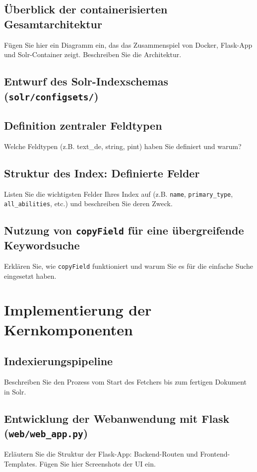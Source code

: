 \subsection{Überblick der containerisierten Gesamtarchitektur}
\label{sec:gesamtarchitektur}
Fügen Sie hier ein Diagramm ein, das das Zusammenspiel von Docker, Flask-App und Solr-Container zeigt. Beschreiben Sie die Architektur.

\subsection{Entwurf des Solr-Indexschemas (\texttt{solr/configsets/})}
\label{sec:solr_schema}

\subsection{Definition zentraler Feldtypen}
Welche Feldtypen (z.B. text\_de, string, pint) haben Sie definiert und warum?

\subsection{Struktur des Index: Definierte Felder}
Listen Sie die wichtigsten Felder Ihres Index auf (z.B. \texttt{name}, \texttt{primary\_type}, \texttt{all\_abilities}, etc.) und beschreiben Sie deren Zweck.

\subsection{Nutzung von \texttt{copyField} für eine übergreifende Keywordsuche}
Erklären Sie, wie \texttt{copyField} funktioniert und warum Sie es für die einfache Suche eingesetzt haben.


\section{Implementierung der Kernkomponenten}
\label{chap:implementierung}

\subsection{Indexierungspipeline}
\label{sec:impl_indexing}
Beschreiben Sie den Prozess vom Start des Fetchers bis zum fertigen Dokument in Solr.

\subsection{Entwicklung der Webanwendung mit Flask (\texttt{web/web\_app.py})}
\label{sec:impl_flask}
Erläutern Sie die Struktur der Flask-App: Backend-Routen und Frontend-Templates. Fügen Sie hier Screenshots der UI ein.

